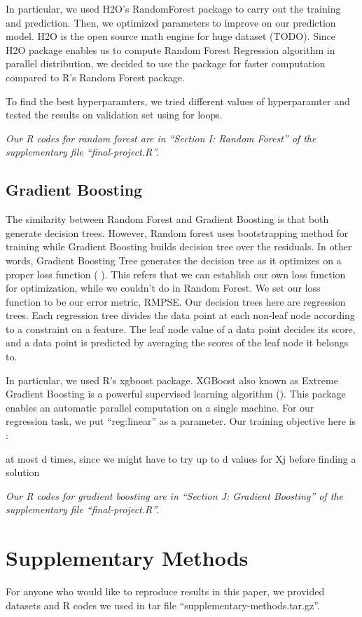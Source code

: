 \documentclass[letterpaper,twocolumn,11pt]{article}
\begin{document}
In particular, we used H2O’s RandomForest package to carry out the training and prediction. Then, we optimized parameters to improve on our prediction model. H2O is the open source math engine for huge dataset (TODO). Since H2O package enables us to compute Random Forest Regression algorithm in parallel distribution, we decided to use the package for faster computation compared to R's Random Forest package.

To find the best hyperparamters, we tried different values of hyperparamter and tested the results on validation set using for loops.

\textit{Our R codes for random forest are in ``Section I: Random Forest'' of the supplementary file ``final-project.R''.}

\subsection{Gradient Boosting}
The similarity between Random Forest and Gradient Boosting is that both generate decision trees. However, Random forest uses bootstrapping method for training while Gradient Boosting builds decision tree over the residuals. In other words, Gradient Boosting Tree generates the decision tree as it optimizes on a proper loss function (   ). This refers that we can establish our own loss function for optimization, while we couldn't do in Random Forest. We set our loss function to be our error metric, RMPSE. Our decision trees here are regression trees. Each regression tree divides the data point at each non-leaf node according to a constraint on a feature. The leaf node value of a data point decides its score, and a data point is predicted by averaging the scores of the leaf node it belongs to.

In particular, we used R's xgboost package. XGBoost also known as Extreme Gradient Boosting is a powerful supervised learning algorithm (). This package enables an automatic parallel computation on a single machine. For our regression task, we put ``reg:linear'' as a parameter. Our training objective here is :

at most d times, since we might have to try up to d values for Xj before finding a solution

\textit{Our R codes for gradient boosting are in ``Section J: Gradient Boosting'' of the supplementary file ``final-project.R''.}

\section{Supplementary Methods}
For anyone who would like to reproduce results in this paper, we provided datasets and R codes we used in tar file ``supplementary-methods.tar.gz''.
\end{document}
